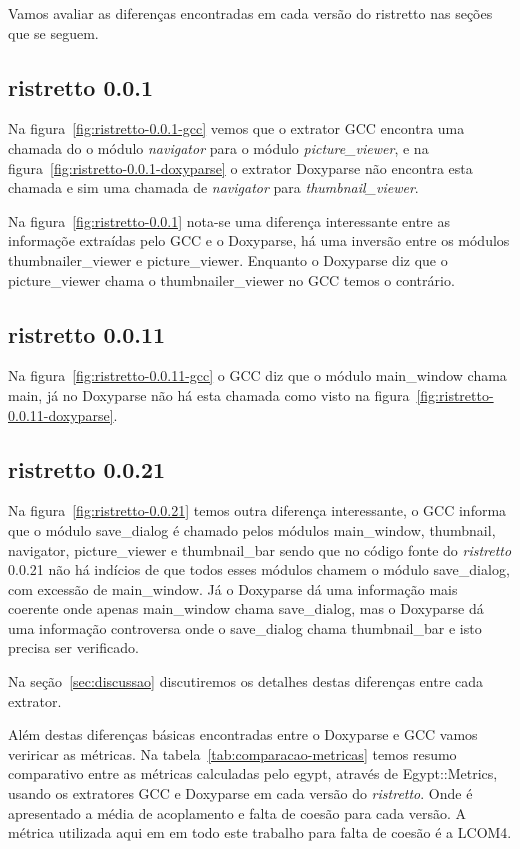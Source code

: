 Vamos avaliar as diferenças encontradas em cada versão do ristretto nas seções que se seguem.

\subsection{ristretto 0.0.1} \label{sec:ristretto-0.0.1}

Na figura~\ref{fig:ristretto-0.0.1-gcc} vemos que o extrator GCC encontra uma chamada do o módulo {\it navigator} para o módulo {\it picture\_viewer}, e na figura~\ref{fig:ristretto-0.0.1-doxyparse} o extrator Doxyparse não encontra esta chamada e sim uma chamada de {\it navigator} para {\it thumbnail\_viewer}.

Na figura~\ref{fig:ristretto-0.0.1} nota-se uma diferença interessante entre as
informaçõe extraídas pelo GCC e o Doxyparse, há uma inversão entre os módulos
thumbnailer\_viewer e picture\_viewer. Enquanto o Doxyparse diz que o
picture\_viewer chama o thumbnailer\_viewer no GCC temos o contrário.

\subsection{ristretto 0.0.11} \label{sec:ristretto-0.0.11}

Na figura~\ref{fig:ristretto-0.0.11-gcc} o GCC diz que o módulo main\_window chama
main, já no Doxyparse não há esta chamada como visto na figura~\ref{fig:ristretto-0.0.11-doxyparse}. 

\subsection{ristretto 0.0.21} \label{sec:ristretto-0.0.21}

Na figura~\ref{fig:ristretto-0.0.21} temos outra diferença interessante, o GCC
informa que o módulo save\_dialog é chamado pelos módulos main\_window,
thumbnail, navigator, picture\_viewer e thumbnail\_bar sendo que no código
fonte do {\it ristretto} 0.0.21 não há indícios de que todos esses módulos chamem o
módulo save\_dialog, com excessão de main\_window. Já o Doxyparse dá uma
informação mais coerente onde apenas main\_window chama save\_dialog, mas o
Doxyparse dá uma informação controversa onde o save\_dialog chama
thumbnail\_bar e isto precisa ser verificado.

Na seção~\ref{sec:discussao} discutiremos os detalhes destas diferenças entre cada extrator.

Além destas diferenças básicas encontradas entre o
Doxyparse e GCC vamos veriricar as métricas. Na tabela~\ref{tab:comparacao-metricas} temos resumo comparativo entre as
métricas calculadas pelo egypt, através de Egypt::Metrics, usando os extratores
GCC e Doxyparse em cada versão do {\it ristretto}. Onde é apresentado a média de
acoplamento e falta de coesão para cada versão. A métrica utilizada aqui em em
todo este trabalho para falta de coesão é a LCOM4.

